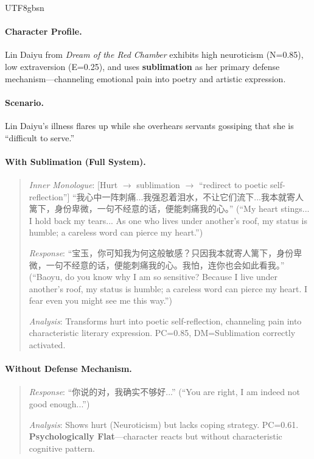 \documentclass[11pt]{article}
\begin{document}
\begin{CJK*}{UTF8}{gbsn}
\paragraph{Character Profile.} Lin Daiyu from \textit{Dream of the Red Chamber} exhibits high neuroticism (N=0.85), low extraversion (E=0.25), and uses \textbf{sublimation} as her primary defense mechanism---channeling emotional pain into poetry and artistic expression.

\paragraph{Scenario.} Lin Daiyu's illness flares up while she overhears servants gossiping that she is ``difficult to serve.''

\paragraph{With Sublimation (Full System).}
\begin{quote}
\textit{Inner Monologue}: [Hurt $\rightarrow$ sublimation $\rightarrow$ ``redirect to poetic self-reflection''] ``我心中一阵刺痛...我强忍着泪水，不让它们流下...我本就寄人篱下，身份卑微，一句不经意的话，便能刺痛我的心。'' (``My heart stings... I hold back my tears... As one who lives under another's roof, my status is humble; a careless word can pierce my heart.'')

\textit{Response}: ``宝玉，你可知我为何这般敏感？只因我本就寄人篱下，身份卑微，一句不经意的话，便能刺痛我的心。我怕，连你也会如此看我。'' (``Baoyu, do you know why I am so sensitive? Because I live under another's roof, my status is humble; a careless word can pierce my heart. I fear even you might see me this way.'')

\textit{Analysis}: Transforms hurt into poetic self-reflection, channeling pain into characteristic literary expression. PC=0.85, DM=Sublimation correctly activated.
\end{quote}

\paragraph{Without Defense Mechanism.}
\begin{quote}
\textit{Response}: ``你说的对，我确实不够好...'' (``You are right, I am indeed not good enough...'')

\textit{Analysis}: Shows hurt (Neuroticism) but lacks coping strategy. PC=0.61. \textbf{Psychologically Flat}---character reacts but without characteristic cognitive pattern.
\end{quote}


\end{CJK*}
\end{document}
